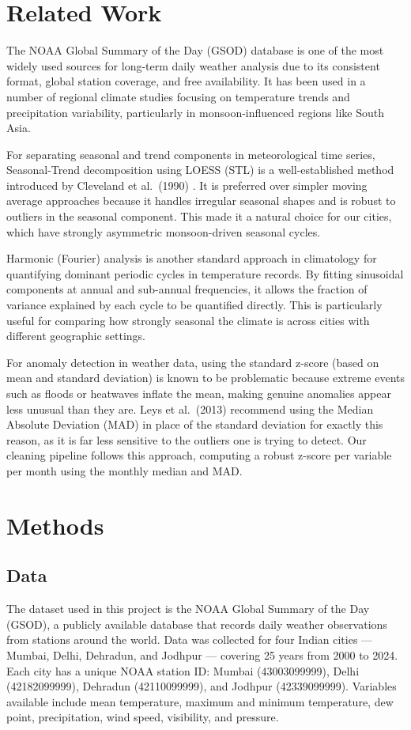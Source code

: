 \section{Related Work}
The NOAA Global Summary of the Day (GSOD) database is one of the most
widely used sources for long-term daily weather analysis due to its
consistent format, global station coverage, and free availability.
It has been used in a number of regional climate studies focusing on
temperature trends and precipitation variability, particularly in
monsoon-influenced regions like South Asia.

For separating seasonal and trend components in meteorological time
series, Seasonal-Trend decomposition using LOESS (STL) is a well-established
method introduced by Cleveland et al.\ (1990) \cite{cleveland1990}.
It is preferred over simpler moving average approaches because it handles
irregular seasonal shapes and is robust to outliers in the seasonal
component. This made it a natural choice for our cities, which have
strongly asymmetric monsoon-driven seasonal cycles.

Harmonic (Fourier) analysis is another standard approach in climatology
for quantifying dominant periodic cycles in temperature records. By
fitting sinusoidal components at annual and sub-annual frequencies,
it allows the fraction of variance explained by each cycle to be
quantified directly. This is particularly useful for comparing how
strongly seasonal the climate is across cities with different geographic
settings.

For anomaly detection in weather data, using the standard z-score
(based on mean and standard deviation) is known to be problematic
because extreme events such as floods or heatwaves inflate the mean,
making genuine anomalies appear less unusual than they are.
Leys et al.\ (2013) \cite{leys2013} recommend using the Median
Absolute Deviation (MAD) in place of the standard deviation for
exactly this reason, as it is far less sensitive to the outliers
one is trying to detect. Our cleaning pipeline follows this approach,
computing a robust z-score per variable per month using the monthly
median and MAD.


\section{Methods}

\subsection{Data}
The dataset used in this project is the NOAA Global Summary of the Day (GSOD),
a publicly available database that records daily weather observations from stations
around the world. Data was collected for four Indian cities --- Mumbai, Delhi,
Dehradun, and Jodhpur --- covering 25 years from 2000 to 2024.
Each city has a unique NOAA station ID: Mumbai (43003099999), Delhi (42182099999),
Dehradun (42110099999), and Jodhpur (42339099999).
Variables available include mean temperature, maximum and minimum temperature,
dew point, precipitation, wind speed, visibility, and pressure.

